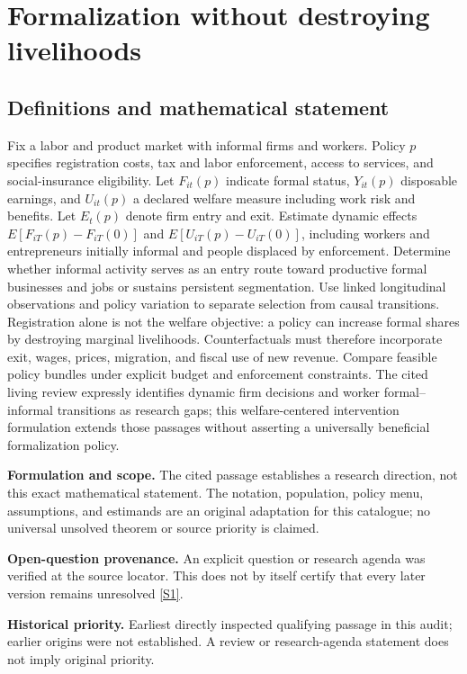 \documentclass[11pt]{article}
\newcommand{\sref}[2]{\hyperlink{source:#1:#2}{[S#2]}}
\begin{document}
\section*{Formalization without destroying livelihoods}\label{30007658}
\subsection{Definitions and mathematical statement}
Fix a labor and product market with informal firms and workers. Policy \(p\) specifies registration costs, tax and labor enforcement, access to services, and social-insurance eligibility. Let \(F_{it}(p)\) indicate formal status, \(Y_{it}(p)\) disposable earnings, and \(U_{it}(p)\) a declared welfare measure including work risk and benefits. Let \(E_t(p)\) denote firm entry and exit. Estimate dynamic effects \(E[F_{iT}(p)-F_{iT}(0)]\) and \(E[U_{iT}(p)-U_{iT}(0)]\), including workers and entrepreneurs initially informal and people displaced by enforcement. Determine whether informal activity serves as an entry route toward productive formal businesses and jobs or sustains persistent segmentation. Use linked longitudinal observations and policy variation to separate selection from causal transitions. Registration alone is not the welfare objective: a policy can increase formal shares by destroying marginal livelihoods. Counterfactuals must therefore incorporate exit, wages, prices, migration, and fiscal use of new revenue. Compare feasible policy bundles under explicit budget and enforcement constraints. The cited living review expressly identifies dynamic firm decisions and worker formal--informal transitions as research gaps; this welfare-centered intervention formulation extends those passages without asserting a universally beneficial formalization policy.

\par\textbf{Formulation and scope.} The cited passage establishes a research direction, not this exact mathematical statement. The notation, population, policy menu, assumptions, and estimands are an original adaptation for this catalogue; no universal unsolved theorem or source priority is claimed.

\par\textbf{Open-question provenance.} An explicit question or research agenda was verified at the source locator. This does not by itself certify that every later version remains unresolved \sref{30007658}{1}.

\par\textbf{Historical priority.} Earliest directly inspected qualifying passage in this audit; earlier origins were not established. A review or research-agenda statement does not imply original priority.
\end{document}
